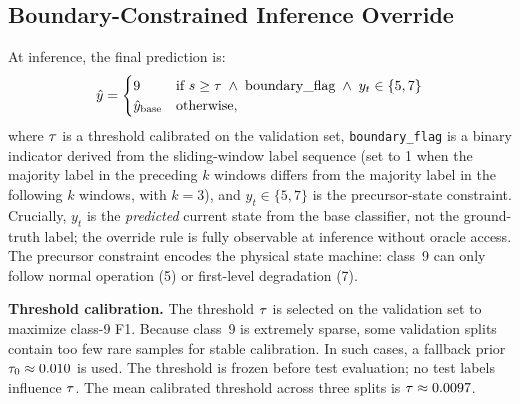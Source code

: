 \subsection{Boundary-Constrained Inference Override}

At inference, the final prediction is:
\begin{equation}
  \hat{y} =
  \begin{cases}
    9 & \text{if } s \geq \tau \;\wedge\; \text{boundary\_flag} \;\wedge\; y_t \in \{5, 7\} \\
    \hat{y}_{\mathrm{base}} & \text{otherwise,}
  \end{cases}
\end{equation}
where $\tau$ is a threshold calibrated on the validation set, \texttt{boundary\_flag} is a binary indicator derived from the sliding-window label sequence (set to 1 when the majority label in the preceding $k$ windows differs from the majority label in the following $k$ windows, with $k=3$), and $y_t \in \{5, 7\}$ is the precursor-state constraint.
Crucially, $y_t$ is the \emph{predicted} current state from the base classifier, not the ground-truth label; the override rule is fully observable at inference without oracle access.
The precursor constraint encodes the physical state machine: class~9 can only follow normal operation (5) or first-level degradation (7).

\textbf{Threshold calibration.}
The threshold $\tau$ is selected on the validation set to maximize class-9 F1.
Because class~9 is extremely sparse, some validation splits contain too few rare samples for stable calibration.
In such cases, a fallback prior $\tau_0 \approx 0.010$ is used.
The threshold is frozen before test evaluation; no test labels influence $\tau$.
The mean calibrated threshold across three splits is $\tau \approx 0.0097$.
